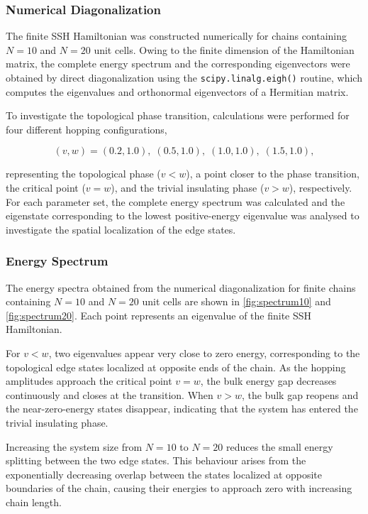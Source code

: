 \documentclass[11pt, a4paper]{article}
\begin{document}
\subsubsection{Numerical Diagonalization}
\label{sec:numerical_diagonalization}
The finite SSH Hamiltonian was constructed numerically for chains containing \(N=10\) and \(N=20\) unit cells. Owing to the finite dimension of the Hamiltonian matrix, the complete energy spectrum and the corresponding eigenvectors were obtained by direct diagonalization using the \texttt{scipy.linalg.eigh()} routine, which computes the eigenvalues and orthonormal eigenvectors of a Hermitian matrix.

To investigate the topological phase transition, calculations were performed for four different hopping configurations,

\[
(v,w)=
(0.2,1.0),\;
(0.5,1.0),\;
(1.0,1.0),\;
(1.5,1.0),
\]

representing the topological phase (\(v<w\)), a point closer to the phase transition, the critical point (\(v=w\)), and the trivial insulating phase (\(v>w\)), respectively. For each parameter set, the complete energy spectrum was calculated and the eigenstate corresponding to the lowest positive-energy eigenvalue was analysed to investigate the spatial localization of the edge states.

\subsubsection{Energy Spectrum}
\label{sec:energy spectra}

The energy spectra obtained from the numerical diagonalization for finite chains containing \(N=10\) and \(N=20\) unit cells are shown in \cref{fig:spectrum10} and \cref{fig:spectrum20}. Each point represents an eigenvalue of the finite SSH Hamiltonian.

For \(v<w\), two eigenvalues appear very close to zero energy, corresponding to the topological edge states localized at opposite ends of the chain. As the hopping amplitudes approach the critical point \(v=w\), the bulk energy gap decreases continuously and closes at the transition. When \(v>w\), the bulk gap reopens and the near-zero-energy states disappear, indicating that the system has entered the trivial insulating phase.

Increasing the system size from \(N=10\) to \(N=20\) reduces the small energy splitting between the two edge states. This behaviour arises from the exponentially decreasing overlap between the states localized at opposite boundaries of the chain, causing their energies to approach zero with increasing chain length.
\end{document}
